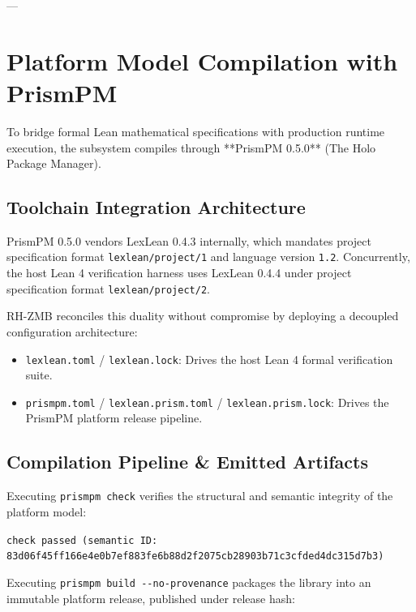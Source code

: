 \documentclass[11pt,a4paper]{article}
\theoremstyle{definition}
\theoremstyle{remark}
\begin{document}
---

\section{Platform Model Compilation with PrismPM}

To bridge formal Lean mathematical specifications with production runtime execution, the subsystem compiles through **PrismPM 0.5.0** (The Holo Package Manager).

\subsection{Toolchain Integration Architecture}
PrismPM 0.5.0 vendors LexLean 0.4.3 internally, which mandates project specification format \texttt{lexlean/project/1} and language version \texttt{1.2}. Concurrently, the host Lean 4 verification harness uses LexLean 0.4.4 under project specification format \texttt{lexlean/project/2}.

RH-ZMB reconciles this duality without compromise by deploying a decoupled configuration architecture:
\begin{itemize}
    \item \texttt{lexlean.toml} / \texttt{lexlean.lock}: Drives the host Lean 4 formal verification suite.
    \item \texttt{prismpm.toml} / \texttt{lexlean.prism.toml} / \texttt{lexlean.prism.lock}: Drives the PrismPM platform release pipeline.
\end{itemize}

\subsection{Compilation Pipeline \& Emitted Artifacts}
Executing \texttt{prismpm check} verifies the structural and semantic integrity of the platform model:
\begin{center}
\texttt{check passed (semantic ID: 83d06f45ff166e4e0b7ef883fe6b88d2f2075cb28903b71c3cfded4dc315d7b3)}
\end{center}
Executing \texttt{prismpm build -{}-no-provenance} packages the library into an immutable platform release, published under release hash:
\begin{center}
\end{center}
\end{document}
